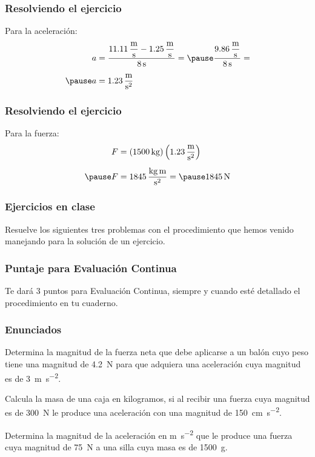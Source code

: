 \documentclass[14pt]{beamer}
\begin{document}
\begin{frame}
\frametitle{Resolviendo el ejercicio}
 Para la aceleración:
\pause
\begin{eqnarray*}
\begin{aligned}
a &= \dfrac{ \displaystyle \SI[per-mode=fraction]{11.11}{\meter\per\second} - \SI[per-mode=fraction]{1.25}{\meter\per\second}}{\SI{8}{\second}} = \pause \dfrac{\displaystyle \SI[per-mode=fraction]{9.86}{\meter\per\second}}{\SI{8}{\second}} = \\[0.5em] \pause
a &= \SI[per-mode=fraction]{1.23}{\meter\per\square\second}
\end{aligned}
\end{eqnarray*}  
\end{frame}
\begin{frame}
\frametitle{Resolviendo el ejercicio}
 Para la fuerza:
\pause
\begin{eqnarray*}
\begin{aligned}
F &= \left( \SI{1500}{\kilo\gram} \right) \left( \SI[per-mode=fraction]{1.23}{\meter\per\square\second} \right) \\[0.5em] \pause
F &= \SI[per-mode=fraction]{1845}{\kilo\gram\meter\per\square\second} = \pause \SI{1845}{\newton}
\end{aligned}
\end{eqnarray*}  
\end{frame}
\begin{frame}
\frametitle{Ejercicios en clase}
Resuelve los siguientes tres problemas con el procedimiento que hemos venido manejando para la solución de un ejercicio.
\end{frame}
\begin{frame}
\frametitle{Puntaje para Evaluación Continua}
Te dará 3 puntos para Evaluación Continua, siempre y cuando esté detallado el procedimiento en tu cuaderno.
\end{frame}
\begin{frame}
\frametitle{Enunciados}
Determina la magnitud de la fuerza neta que debe aplicarse a un balón cuyo peso tiene una magnitud de
\SI{4.2}{\newton} para que adquiera una aceleración cuya magnitud es de \SI{3}{\meter\per\square\second}.

Calcula la masa de una caja en kilogramos, si al recibir una fuerza cuya magnitud es de \SI{300}{\newton} le produce una aceleración con una magnitud de \SI{150}{\centi\meter\per\square\second}.

Determina la magnitud de la aceleración en \unit{\meter\per\square\second} que le produce una fuerza cuya magnitud de \SI{75}{\newton} a una silla cuya masa es de \SI{1500}{\gram}.
\end{frame}
\end{document}

